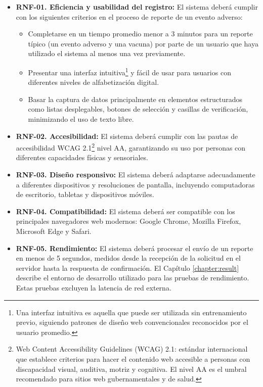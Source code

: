 \begin{itemize}

\item \textbf{RNF-01. Eficiencia y usabilidad del registro:}  
El sistema deberá cumplir con los siguientes criterios en el proceso de reporte de un evento adverso:
\begin{itemize}
    \item Completarse en un tiempo promedio menor a 3 minutos para un reporte típico (un evento adverso y una vacuna) por parte de un usuario que haya utilizado el sistema al menos una vez previamente.
    \item Presentar una interfaz intuitiva\footnote{Una interfaz intuitiva es aquella que puede ser utilizada sin entrenamiento previo, siguiendo patrones de diseño web convencionales reconocidos por el usuario promedio.} y fácil de usar para usuarios con diferentes niveles de alfabetización digital.
    \item Basar la captura de datos principalmente en elementos estructurados como listas desplegables, botones de selección y casillas de verificación, minimizando el uso de texto libre.
\end{itemize}

\item \textbf{RNF-02. Accesibilidad:}  
El sistema deberá cumplir con las pautas de accesibilidad WCAG 2.1\footnote{Web Content Accessibility Guidelines (WCAG) 2.1: estándar internacional que establece criterios para hacer el contenido web accesible a personas con discapacidad visual, auditiva, motriz y cognitiva. El nivel AA es el umbral recomendado para sitios web gubernamentales y de salud.} nivel AA, garantizando su uso por personas con diferentes capacidades físicas y sensoriales.

\item \textbf{RNF-03. Diseño responsivo:}  
El sistema deberá adaptarse adecuadamente a diferentes dispositivos y resoluciones de pantalla, incluyendo computadoras de escritorio, tabletas y dispositivos móviles.

\item \textbf{RNF-04. Compatibilidad:}  
El sistema deberá ser compatible con los principales navegadores web modernos: Google Chrome, Mozilla Firefox, Microsoft Edge y Safari.

\item \textbf{RNF-05. Rendimiento:}  
El sistema deberá procesar el envío de un reporte en menos de 5 segundos, medidos desde la recepción de la solicitud en el servidor hasta la respuesta de confirmación. 
El Capítulo \ref{chapter:result} describe el entorno de desarrollo utilizado para las pruebas de rendimiento. Estas pruebas excluyen la latencia de red externa.


\end{itemize}
